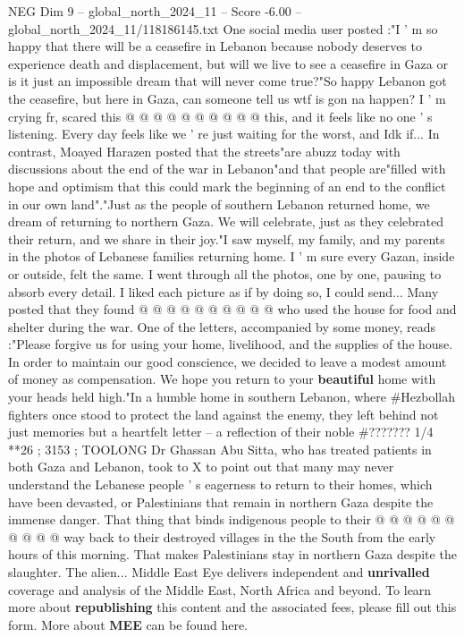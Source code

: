 \begin{textsample}{NEG Dim 9 – global\_north\_2024\_11 – Score -6.00 – global\_north\_2024\_11/118186145.txt}
One social media user posted :"I ' m so happy that there will be a ceasefire in Lebanon because nobody deserves to experience death and displacement, but will we live to see a ceasefire in Gaza or is it just an impossible dream that will never come true?"So happy Lebanon got the ceasefire, but here in Gaza, can someone tell us wtf is gon na happen?
I ' m crying fr, scared this @ @ @ @ @ @ @ @ @ @ this, and it feels like no one ' s listening.
Every day feels like we ' re just waiting for the worst, and Idk if...
In contrast, Moayed Harazen posted that the streets"are abuzz today with discussions about the end of the war in Lebanon"and that people are"filled with hope and optimism that this could mark the beginning of an end to the conflict in our own land"."Just as the people of southern Lebanon returned home, we dream of returning to northern Gaza.
We will celebrate, just as they celebrated their return, and we share in their joy."I saw myself, my family, and my parents in the photos of Lebanese families returning home.
I ' m sure every Gazan, inside or outside, felt the same.
I went through all the photos, one by one, pausing to absorb every detail.
I liked each picture as if by doing so, I could send...
Many posted that they found @ @ @ @ @ @ @ @ @ @ who used the house for food and shelter during the war.
One of the letters, accompanied by some money, reads :"Please forgive us for using your home, livelihood, and the supplies of the house.
In order to maintain our good conscience, we decided to leave a modest amount of money as compensation.
We hope you return to your \textbf{beautiful} home with your heads held high."In a humble home in southern Lebanon, where \#Hezbollah fighters once stood to protect the land against the enemy, they left behind not just memories but a heartfelt letter -- a reflection of their noble \#??????? 1/4 **26 ; 3153 ; TOOLONG Dr Ghassan Abu Sitta, who has treated patients in both Gaza and Lebanon, took to X to point out that many may never understand the Lebanese people ' s eagerness to return to their homes, which have been devasted, or Palestinians that remain in northern Gaza despite the immense danger.
That thing that binds indigenous people to their @ @ @ @ @ @ @ @ @ @ way back to their destroyed villages in the the South from the early hours of this morning.
That makes Palestinians stay in northern Gaza despite the slaughter.
The alien...
Middle East Eye delivers independent and \textbf{unrivalled} coverage and analysis of the Middle East, North Africa and beyond.
To learn more about \textbf{republishing} this content and the associated fees, please fill out this form.
More about \textbf{MEE} can be found here.

\end{textsample}
